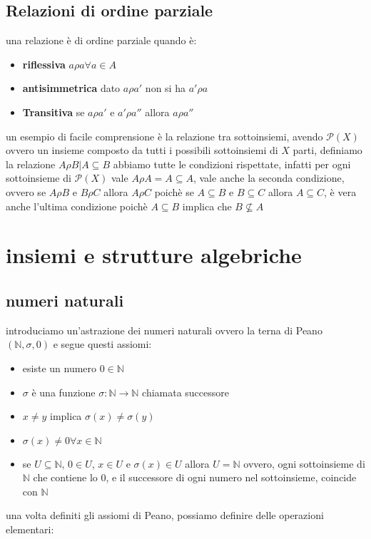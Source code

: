 \documentclass{article}
\begin{document}
    \subsection{Relazioni di ordine parziale}
        una relazione è di ordine parziale quando è:

        \begin{itemize}
            \item \textbf{riflessiva} $a\rho a \forall a \in A$
            \item \textbf{antisimmetrica} dato $a\rho a'$ non si ha $a' \rho a$
            \item \textbf{Transitiva} se $a \rho a'$ e $a' \rho a''$ allora $a\rho a''$
        \end{itemize}

        un esempio di facile comprensione è la relazione tra sottoinsiemi, avendo $\mathcal{P}(X)$ ovvero un insieme composto da tutti i possibili sottoinsiemi di $X$ parti, definiamo la relazione $A\rho B|A\subseteq B$ abbiamo tutte le condizioni rispettate, infatti per ogni sottoinsieme di $\mathcal{P}(X)$ vale $A\rho A = A\subseteq A$, vale anche la seconda condizione, ovvero se $A\rho B$ e $B \rho C$ allora $A\rho C$ poichè se $A\subseteq B$ e $B\subseteq C$ allora $A\subseteq C$, è vera anche l'ultima condizione poichè $A\subseteq B$ implica che $B\not \subseteq A $ 

\section{insiemi e strutture algebriche}
    \subsection{numeri naturali}
        introduciamo un'astrazione dei numeri naturali ovvero la terna di Peano $(\mathbb{N},\sigma,0)$ e segue questi assiomi:

        \begin{itemize}
            \item esiste un numero $0 \in \mathbb{N}$
            
            \item $\sigma$ è una funzione $\sigma: \mathbb{N} \rightarrow \mathbb{N}$ chiamata successore
            
            \item $x\neq y$ implica $\sigma(x)\neq \sigma(y)$
            
            \item $\sigma(x)\neq 0 \forall x \in \mathbb{N}$
            
            \item se $U\subseteq \mathbb{N}$, $0\in U$, $x\in U$ e $\sigma(x)\in U$ allora $U=\mathbb{N}$ ovvero, ogni sottoinsieme di $\mathbb{N}$ che contiene lo $0$, e il successore di ogni numero nel sottoinsieme, coincide con $\mathbb{N}$
        \end{itemize}
%
        una volta definiti gli assiomi di Peano, possiamo definire delle operazioni elementari:
\end{document}
